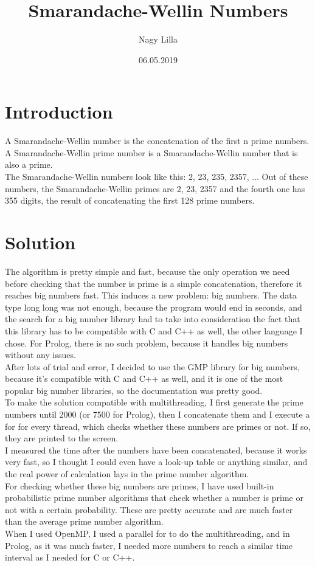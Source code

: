 \documentclass{article}
\title{Smarandache-Wellin Numbers}
\author{Nagy Lilla}
\date{06.05.2019}
\begin{document}
\maketitle

\section{Introduction}

A Smarandache-Wellin number is the concatenation of the first n prime numbers. A Smarandache-Wellin prime number is a Smarandache-Wellin number that is also a prime. \\
The Smarandache-Wellin numbers look like this: 2, 23, 235, 2357, ...
Out of these numbers, the Smarandache-Wellin primes are 2, 23, 2357 and the fourth one has 355 digits, the result of concatenating the first 128 prime numbers.

\section{Solution}

The algorithm is pretty simple and fast, because the only operation we need before checking that the number is prime is a simple concatenation, therefore it reaches big numbers fast. This induces a new problem: big numbers. The data type long long was not enough, because the program would end in seconds, and the search for a big number library had to take into consideration the fact that this library has to be compatible with C and C++ as well, the other language I chose. For Prolog, there is no such problem, because it handles big numbers without any issues. \\
After lots of trial and error, I decided to use the GMP library for big numbers, because it's compatible with C and C++ as well, and it is one of the most popular big number libraries, so the documentation was pretty good. \\
To make the solution compatible with multithreading, I first generate the prime numbers until 2000 (or 7500 for Prolog), then I concatenate them and I execute a for for every thread, which checks whether these numbers are primes or not. If so, they are printed to the screen. \\ 
I measured the time after the numbers have been concatenated, because it works very fast, so I thought I could even have a look-up table or anything similar, and the real power of calculation lays in the prime number algorithm. \\
For checking whether these big numbers are primes, I have used built-in probabilistic prime number algorithms that check whether a number is prime or not with a certain probability. These are pretty accurate and are much faster than the average prime number algorithm. \\
When I used OpenMP, I used a parallel for to do the multithreading, and in Prolog, as it was much faster, I needed more numbers to reach a similar time interval as I needed for C or C++.
\end{document}
